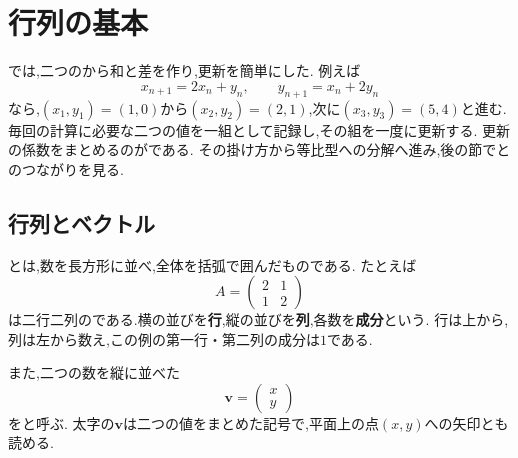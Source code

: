 
\section{行列の基本}\label{節：行列の基本}

では,二つのから和と差を作り,更新を簡単にした.
例えば
\[
  x_{n+1}=2x_n+y_n,\qquad y_{n+1}=x_n+2y_n
\]
なら,$(x_1,y_1)=(1,0)$から$(x_2,y_2)=(2,1)$,次に$(x_3,y_3)=(5,4)$と進む.
毎回の計算に必要な二つの値を一組として記録し,その組を一度に更新する.
更新の係数をまとめるのがである.
その掛け方から等比型への分解へ進み,後の節でとのつながりを見る.

\subsection{行列とベクトル}

とは,数を長方形に並べ,全体を括弧で囲んだものである.
たとえば
\[
  A=\begin{pmatrix}2&1\\1&2\end{pmatrix}
\]
は二行二列のである.横の並びを\textbf{行},縦の並びを\textbf{列},各数を\textbf{成分}という.
行は上から,列は左から数え,この例の第一行・第二列の成分は$1$である.

また,二つの数を縦に並べた
\[
  \boldsymbol{v}=\begin{pmatrix}x\\y\end{pmatrix}
\]
を\textbf{}と呼ぶ.
太字の$\boldsymbol{v}$は二つの値をまとめた記号で,平面上の点$(x,y)$への矢印とも読める.

